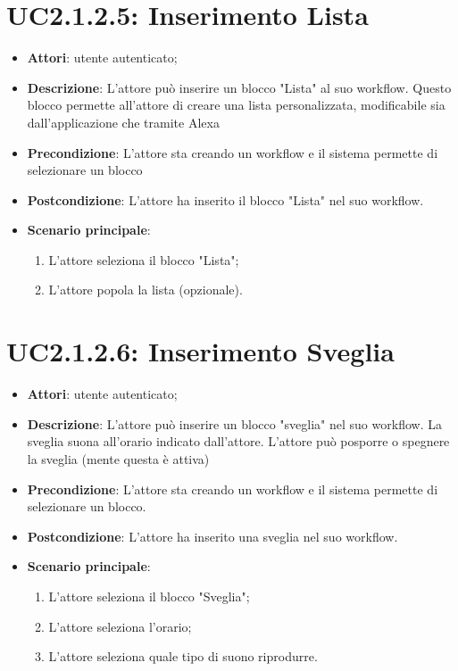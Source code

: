 \section{UC2.1.2.5: Inserimento Lista}
\label{UC2.1.2.5}
\begin{itemize}
	\item \textbf{Attori}: utente autenticato;
	\item \textbf{Descrizione}: L'attore può inserire un blocco "Lista" al suo workflow. Questo blocco permette all'attore di creare una lista personalizzata, modificabile sia dall'applicazione che tramite Alexa
	\item \textbf{Precondizione}: L'attore sta creando un workflow e il sistema permette di selezionare un blocco
	\item \textbf{Postcondizione}: L'attore ha inserito il blocco "Lista" nel suo workflow.
	\item \textbf{Scenario principale}:
	\begin{enumerate} \item L'attore seleziona il blocco "Lista";  \item  L'attore popola la lista (opzionale).\end{enumerate}
\end{itemize}

\section{UC2.1.2.6: Inserimento Sveglia}
\label{UC2.1.2.6}
\begin{itemize}
	\item \textbf{Attori}: utente autenticato;
	\item \textbf{Descrizione}: L'attore può inserire un blocco "sveglia" nel suo workflow. La sveglia suona all'orario indicato dall'attore. L'attore può posporre o spegnere la sveglia (mente questa è attiva)
	\item \textbf{Precondizione}: L'attore sta creando un workflow e il sistema permette di selezionare un blocco.
	\item \textbf{Postcondizione}: L'attore ha inserito una sveglia nel suo workflow.
	\item \textbf{Scenario principale}:
	\begin{enumerate} \item L'attore seleziona il blocco "Sveglia";  \item  L'attore seleziona l'orario;  \item  L'attore seleziona quale tipo di suono riprodurre.\end{enumerate}
\end{itemize}

